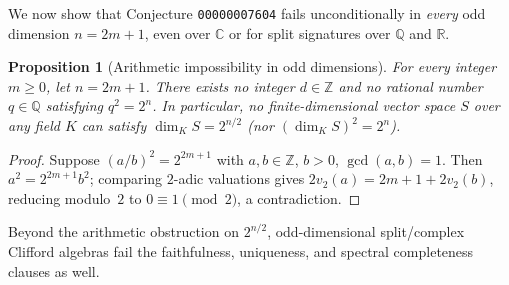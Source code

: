 \documentclass[11pt,a4paper]{article}
\theoremstyle{plain}
\newtheorem{proposition}[theorem]{Proposition}
\theoremstyle{definition}
\theoremstyle{remark}
\begin{document}
We now show that Conjecture \texttt{00000007604} fails unconditionally in \emph{every} odd dimension $n = 2m + 1$, even over $\mathbb{C}$ or for split signatures over $\mathbb{Q}$ and $\mathbb{R}$.

\begin{proposition}[Arithmetic impossibility in odd dimensions]\label{prop:odd-arith}
For every integer $m \ge 0$, let $n = 2m + 1$. There exists no integer $d \in \mathbb{Z}$ and no rational number $q \in \mathbb{Q}$ satisfying $q^2 = 2^n$. In particular, no finite-dimensional vector space $S$ over any field $K$ can satisfy $\dim_K S = 2^{n/2}$ (nor $(\dim_K S)^2 = 2^n$).
\end{proposition}

\begin{proof}
Suppose $(a/b)^2 = 2^{2m+1}$ with $a, b \in \mathbb{Z}$, $b > 0$, $\gcd(a, b) = 1$. Then $a^2 = 2^{2m+1} b^2$; comparing $2$-adic valuations gives $2 v_2(a) = 2m + 1 + 2 v_2(b)$, reducing modulo~$2$ to $0 \equiv 1 \pmod{2}$, a contradiction.
\end{proof}

Beyond the arithmetic obstruction on $2^{n/2}$, odd-dimensional split/complex Clifford algebras fail the faithfulness, uniqueness, and spectral completeness clauses as well.
\end{document}
